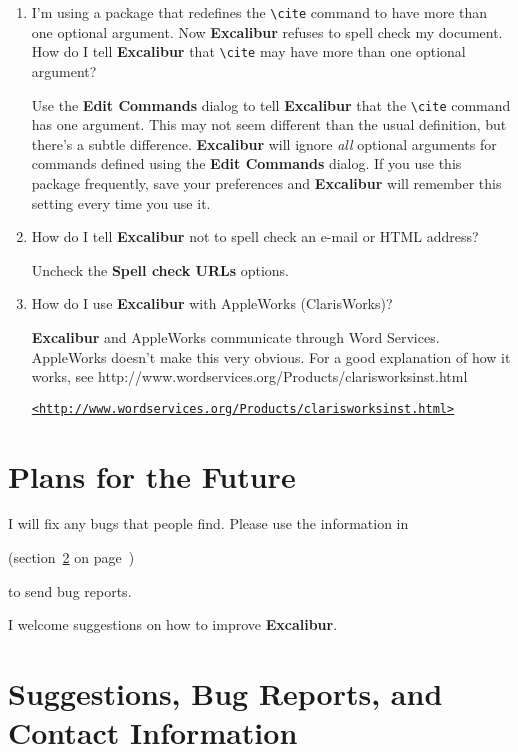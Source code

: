 \documentclass[11pt,titlepage]{article}
\newcommand{\ex}{\textbf{Excalibur}}
\begin{document}
\begin{enumerate}
\item I'm using a package that redefines the \verb+\cite+ command to
  have more than one optional argument.  Now \ex{} refuses to spell
  check my document.  How do I tell \ex{} that \verb+\cite+ may have
  more than one optional argument?

  Use the \textbf{Edit Commands} dialog to tell \ex{} that the
  \verb+\cite+ command has one argument.  This may not seem different
  than the usual definition, but there's a subtle difference.  \ex{}
  will ignore \emph{all} optional arguments for commands defined using
  the \textbf{Edit Commands} dialog.  If you use this package
  frequently, save your preferences and \ex{} will remember this
  setting every time you use it.

\item How do I tell \ex{} not to spell check an e-mail or HTML
  address?

  Uncheck the \textbf{Spell check URLs} options.

\item How do I use \ex{} with AppleWorks (ClarisWorks)?

  \ex{} and AppleWorks communicate through Word Services. AppleWorks
  doesn't make this very obvious.  For a good explanation of how it
  works, see 
  {http://www.wordservices.org/Products/clarisworksinst.html}
  \begin{latexonly}
\begin{alltt}
\url{<http://www.wordservices.org/Products/clarisworksinst.html>}
\end{alltt}
  \end{latexonly}

\end{enumerate}

\section{Plans for the Future}

I will fix any bugs that people find. Please use the information in
\begin{latexonly}
  (section~\ref{sec:bugs} on page~\pageref{sec:bugs})
\end{latexonly}
to send bug reports.

I welcome suggestions on how to improve \ex.

\section{Suggestions, Bug Reports, and Contact Information}
\label{sec:bugs}
\end{document}
